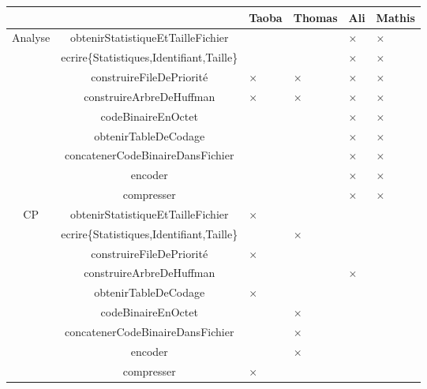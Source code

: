  
 \begin{table}[ht]
    \centering
    \begin{tabular}{|c|c|>{\centering\arraybackslash}p{1.5cm}|>{\centering\arraybackslash}p{1.5cm}|>{\centering\arraybackslash}p{1.5cm}|>{\centering\arraybackslash}p{1.5cm}|}
        \cline{3-6}
        \multicolumn{2}{c|}{} & Taoba & Thomas & Ali & Mathis \\
        \hline
        \multirow{8}{*}{Analyse}
        & obtenirStatistiqueEtTailleFichier & & & $\times$ & $\times$ \\
        \cline{2-6}
        & ecrire\{Statistiques,Identifiant,Taille\} &  & & $\times$ & $\times$ \\ 
        \cline{2-6}
        & construireFileDePriorité & $\times$ & $\times$ & $\times$ & $\times$ \\
        \cline{2-6}
        & construireArbreDeHuffman & $\times$ & $\times$ & $\times$ & $\times$ \\
        & codeBinaireEnOctet & & & $\times$ & $\times$ \\
        & obtenirTableDeCodage & & & $\times$ & $\times$ \\
        \cline{2-6}
        \cline{2-6}
        & concatenerCodeBinaireDansFichier & & & $\times$ & $\times$ \\
        \cline{2-6}
        & encoder & & & $\times$ & $\times$ \\
        \cline{2-6}
        \cline{2-6}
        & compresser & & & $\times$ & $\times$ \\
        \hline
        \multirow{8}{*}{CP}
        & obtenirStatistiqueEtTailleFichier & $\times$ & & &  \\
        \cline{2-6}
        & ecrire\{Statistiques,Identifiant,Taille\} & & $\times$ & & \\ 
        \cline{2-6}
        & construireFileDePriorité & $\times$ & & &  \\
        \cline{2-6}
        & construireArbreDeHuffman & & & $\times$ & \\
        \cline{2-6}
        & obtenirTableDeCodage & $\times$ & & &  \\
        \cline{2-6}
        & codeBinaireEnOctet & & $\times$& & \\
        \cline{2-6}
        & concatenerCodeBinaireDansFichier & & $\times$ & & \\
        \cline{2-6}
        & encoder & & $\times$ & & \\
        \cline{2-6}
        & compresser & $\times$ & & & \\

\end{tabular}
\end{table}
